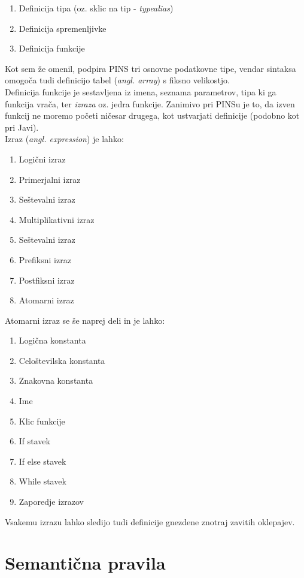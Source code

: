 \documentclass[a4paper, 12pt]{book}
\begin{document}
\begin{enumerate}
	\item Definicija tipa (oz. sklic na tip - \textit{typealias})
	\item Definicija spremenljivke
	\item Definicija funkcije
\end{enumerate}

Kot sem že omenil, podpira PINS tri osnovne podatkovne tipe, vendar sintaksa omogoča tudi definicijo tabel (\textit{angl. array}) s fiksno velikostjo. \\
\indent Definicija funkcije je sestavljena iz imena, seznama parametrov, tipa ki ga funkcija vrača, ter \textit{izraza} oz. jedra funkcije. Zanimivo pri PINSu je to, da izven funkcij ne moremo početi ničesar drugega, kot ustvarjati definicije (podobno kot pri Javi). \\
\indent Izraz (\textit{angl. expression}) je lahko:
\begin{enumerate}
	\item Logični izraz
	\item Primerjalni izraz
	\item Seštevalni izraz
	\item Multiplikativni izraz
	\item Seštevalni izraz
	\item Prefiksni izraz
	\item Postfiksni izraz
	\item Atomarni izraz
\end{enumerate}

Atomarni izraz se še naprej deli in je lahko:
\begin{enumerate}
	\item Logična konstanta
	\item Celoštevilska konstanta
	\item Znakovna konstanta
	\item Ime
	\item Klic funkcije
	\item If stavek
	\item If else stavek
	\item While stavek
	\item Zaporedje izrazov
\end{enumerate}

Vsakemu izrazu lahko sledijo tudi definicije gnezdene znotraj zavitih oklepajev.

\section{Semantična pravila}
\end{document}
